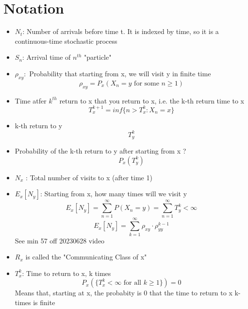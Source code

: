 \documentclass{report}
\begin{document}
%
%
%
%
%
%
%
%
%
%    
%
\chapter*{Notation}%
  \begin{itemize}
      \item $N_t$: Number of arrivals before time t.  It is indexed by
        time, so it is a continuous-time stochastic process
      \item $S_n$: Arrival time of $n^{th}$ "particle"
      \item $\rho_{xy}: $ Probability that starting from x, we will visit y in finite time
        \[ \rho_{xy} = P_x(X_n = y \text{ for some  } n \geq 1) \]
      \item Time atfer $k^{th}$ return to x that you return to x, i.e. the k-th return time to x
        \[ T^{k+1}_x = inf \{n > T_x^k : X_n = x \}  \]
      \item k-th return to y
        \[ T^k_y \]
      \item Probability of the k-th return to y after starting from x ?
        \[ P_x(T^k_y) \]
      \item $N_x$ : Total number of visits to x (after time 1)
      \item $E_x[N_y]$: Starting from x, how many times will we visit y
          \[ E_x[N_y] = \sum^{\infty}_{n=1} P(X_n=y) = \sum^{\infty}_{n=1} T_y^k < \infty  \]
          \[ E_x[N_y] = \sum^{\infty}_{k=1} \rho_{xy} \cdot \rho^{k-1}_{yy}   \]
            See min 57 off 20230628 video
      \item $R_x$ is called the "Communicating Class of x"
      \item $T^k_x$: Time to return to x, k times
        \[ P_x(\{T^k_x < \infty \text{ for all } k \geq 1\}) = 0 \]
        Means that, starting at x, the probabity is 0 that the time to return to x k-times is finite
  \end{itemize}
\end{document}
